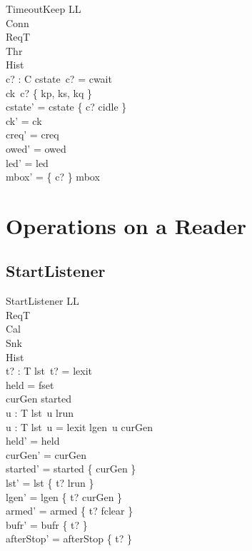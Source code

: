 \documentclass[a4paper,10pt,fleqn]{article}
\begin{document}
\begin{schema}{TimeoutKeep}
  \Delta LL \\
  \Xi Conn \\
  \Xi ReqT \\
  \Xi Thr \\
  \Xi Hist \\
  c? : C
\where
  cstate~c? = cwait \\
  ck~c? \in \{ kp, ks, kq \} \\
  cstate' = cstate \oplus \{ c? \mapsto cidle \} \\
  ck' = ck \\
  creq' = creq \\
  owed' = owed \\
  led' = led \\
  mbox' = \{ c? \} \ndres mbox
\end{schema}

\section{Operations on a Reader}

\subsection{StartListener}

\begin{schema}{StartListener}
  \Delta LL \\
  \Xi ReqT \\
  \Xi Cal \\
  \Xi Snk \\
  \Xi Hist \\
  t? : T
\where
  lst~t? = lexit \\
  held = fset \\
  curGen \notin started \\
  \forall u : T \spot lst~u \neq lrun \\
  \forall u : T \spot lst~u = lexit \lor lgen~u \neq curGen \\
  held' = held \\
  curGen' = curGen \\
  started' = started \cup \{ curGen \} \\
  lst' = lst \oplus \{ t? \mapsto lrun \} \\
  lgen' = lgen \oplus \{ t? \mapsto curGen \} \\
  armed' = armed \oplus \{ t? \mapsto fclear \} \\
  bufr' = bufr \oplus \{ t? \mapsto \emptyset \} \\
  afterStop' = afterStop \oplus \{ t?  \}
\end{schema}
\end{document}

